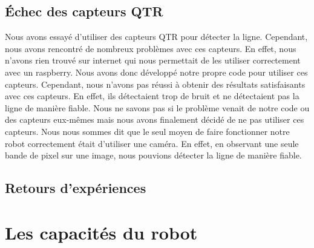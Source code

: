 \subsection{Échec des capteurs QTR}
Nous avons essayé d'utiliser des capteurs QTR pour détecter la ligne. Cependant, nous avons rencontré de nombreux problèmes avec ces capteurs. En effet, nous n'avons rien trouvé sur internet qui nous permettait de les utiliser correctement avec un raspberry.
Nous avons donc développé notre propre code pour utiliser ces capteurs. Cependant, nous n'avons pas réussi à obtenir des résultats satisfaisants avec ces capteurs. En effet, ils détectaient trop de bruit et ne détectaient pas la ligne de manière fiable.
Nous ne savons pas si le problème venait de notre code ou des capteurs eux-mêmes mais nous avons finalement décidé de ne pas utiliser ces capteurs.
Nous nous sommes dit que le seul moyen de faire fonctionner notre robot correctement était d'utiliser une caméra. En effet, en observant une seule bande de pixel sur une image, nous pouvions détecter la ligne de manière fiable.


\subsection{Retours d'expériences}
\section{Les capacités du robot}